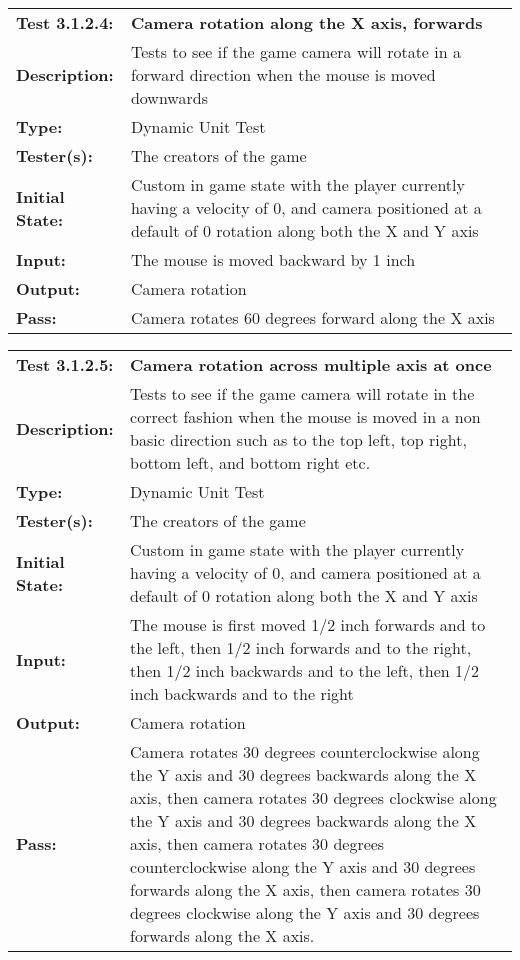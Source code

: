 \documentclass[12pt, titlepage]{article}
\begin{document}
\begin{enumerate}
\begin{mdframed}[linewidth=1pt]
\begin{tabularx}{\textwidth}{@{}p{3cm}X@{}}
{\bf Test 3.1.2.4:} & {\bf Camera rotation along the X axis, forwards}\\[\baselineskip]
{\bf Description:} & Tests to see if the game camera will rotate in a forward direction when the mouse is moved downwards\\[0.5\baselineskip]
{\bf Type:} & Dynamic Unit Test\\[0.5\baselineskip]
{\bf Tester(s):} & The creators of the game\\[0.5\baselineskip]
{\bf Initial State:} & Custom in game state with the player currently having a velocity of 0, and camera positioned at a default of 0 rotation along both the X and Y axis\\[0.5\baselineskip]
{\bf Input:} & The mouse is moved backward by 1 inch\\[0.5\baselineskip]
{\bf Output:} & Camera rotation\\[0.5\baselineskip]
{\bf Pass:} & Camera rotates 60 degrees forward along the X axis
\end{tabularx}
\end{mdframed}

\begin{mdframed}[linewidth=1pt]
\begin{tabularx}{\textwidth}{@{}p{3cm}X@{}}
{\bf Test 3.1.2.5:} & {\bf Camera rotation across multiple axis at once}\\[\baselineskip]
{\bf Description:} & Tests to see if the game camera will rotate in the correct fashion when the mouse is moved in a non basic direction such as to the top left,  top right, bottom left, and bottom right etc. \\[0.5\baselineskip]
{\bf Type:} & Dynamic Unit Test\\[0.5\baselineskip]
{\bf Tester(s):} & The creators of the game\\[0.5\baselineskip]
{\bf Initial State:} & Custom in game state with the player currently having a velocity of 0, and camera positioned at a default of 0 rotation along both the X and Y axis\\[0.5\baselineskip]
{\bf Input:} & The mouse is first moved 1/2 inch forwards and to the left, then 1/2 inch forwards and to the right, then 1/2 inch backwards and to the left, then 1/2 inch backwards and to the right\\[0.5\baselineskip]
{\bf Output:} & Camera rotation\\[0.5\baselineskip]
{\bf Pass:} & Camera rotates 30 degrees counterclockwise along the Y axis and 30 degrees backwards along the X axis, then camera rotates 30 degrees clockwise along the Y axis and 30 degrees backwards along the X axis, then camera rotates 30 degrees counterclockwise along the Y axis and 30 degrees forwards along the X axis, then camera rotates 30 degrees clockwise along the Y axis and 30 degrees forwards along the X axis.
\end{tabularx}
\end{mdframed}


\end{enumerate}
\end{document}
